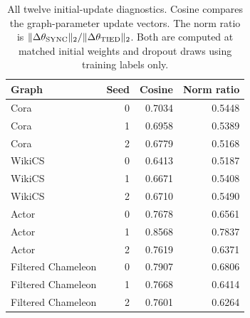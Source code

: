 \begin{table}[t]
\centering
\caption{All twelve initial-update diagnostics. Cosine compares the graph-parameter update vectors. The norm ratio is $\|\Delta\theta_{\rm SYNC}\|_2/\|\Delta\theta_{\rm TIED}\|_2$. Both are computed at matched initial weights and dropout draws using training labels only.}
\label{tab:initial-update}
\small
\begin{tabular}{lrrr}
\toprule
Graph & Seed & Cosine & Norm ratio\\
\midrule
Cora & 0 & 0.7034 & 0.5448\\
Cora & 1 & 0.6958 & 0.5389\\
Cora & 2 & 0.6779 & 0.5168\\
WikiCS & 0 & 0.6413 & 0.5187\\
WikiCS & 1 & 0.6671 & 0.5408\\
WikiCS & 2 & 0.6710 & 0.5490\\
Actor & 0 & 0.7678 & 0.6561\\
Actor & 1 & 0.8568 & 0.7837\\
Actor & 2 & 0.7619 & 0.6371\\
Filtered Chameleon & 0 & 0.7907 & 0.6806\\
Filtered Chameleon & 1 & 0.7668 & 0.6414\\
Filtered Chameleon & 2 & 0.7601 & 0.6264\\
\bottomrule
\end{tabular}
\end{table}
